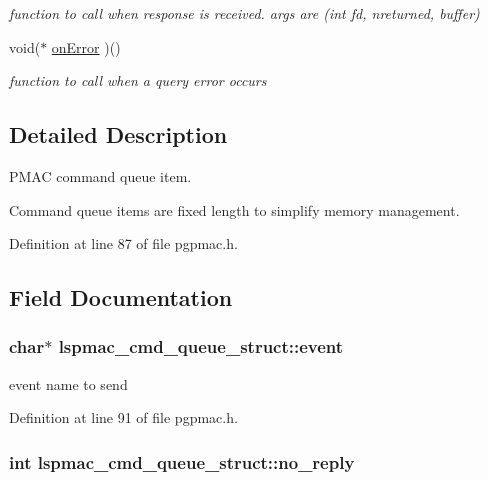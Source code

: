 \begin{DoxyCompactItemize}
\begin{DoxyCompactList}\small\item\em function to call when response is received. args are (int fd, nreturned, buffer) \end{DoxyCompactList}\item 
void($\ast$ \hyperlink{structlspmac__cmd__queue__struct_a321aa9e980b80c8627ea485ed01eb4f8}{on\-Error} )()
\begin{DoxyCompactList}\small\item\em function to call when a query error occurs \end{DoxyCompactList}\end{DoxyCompactItemize}


\subsection{Detailed Description}
P\-M\-A\-C command queue item. 

Command queue items are fixed length to simplify memory management. 

Definition at line 87 of file pgpmac.\-h.



\subsection{Field Documentation}
\hypertarget{structlspmac__cmd__queue__struct_ace4d453ad6d6225e910dffb33cde866a}{
\subsubsection[{event}]{\setlength{\rightskip}{0pt plus 5cm}char$\ast$ lspmac\-\_\-cmd\-\_\-queue\-\_\-struct\-::event}}\label{structlspmac__cmd__queue__struct_ace4d453ad6d6225e910dffb33cde866a}


event name to send 



Definition at line 91 of file pgpmac.\-h.

\hypertarget{structlspmac__cmd__queue__struct_a33f70b45f8b7c27935cd3efe28748479}{
\subsubsection[{no\-\_\-reply}]{\setlength{\rightskip}{0pt plus 5cm}int lspmac\-\_\-cmd\-\_\-queue\-\_\-struct\-::no\-\_\-reply}}\label{structlspmac__cmd__queue__struct_a33f70b45f8b7c27935cd3efe28748479}


